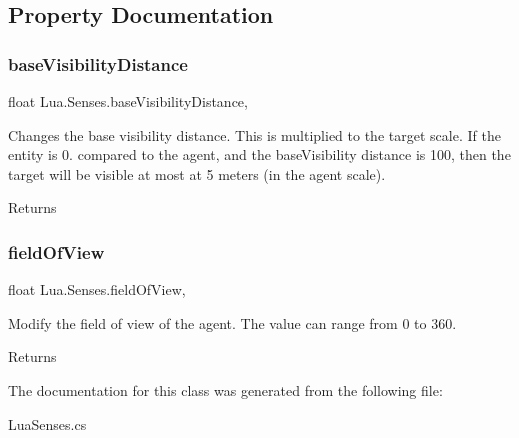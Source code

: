 \subsection{Property Documentation}
\mbox{\label{class_lua_1_1_senses_aed3385cd359ba4734ac8c114b524a1b2}} 
\subsubsection{\texorpdfstring{baseVisibilityDistance}{baseVisibilityDistance}}
{\footnotesize\ttfamily float Lua.\+Senses.\+base\+Visibility\+Distance\hspace{0.3cm}{\ttfamily [get]}, {\ttfamily [set]}}



Changes the base visibility distance. This is multiplied to the target scale. If the entity is 0. compared to the agent, and the base\+Visibility distance is 100, then the target will be visible at most at 5 meters (in the agent scale). 

\begin{DoxyReturn}{Returns}

\end{DoxyReturn}
\mbox{\label{class_lua_1_1_senses_ac4a708caaa7a7381870d4f21d619c2e9}} 
\subsubsection{\texorpdfstring{fieldOfView}{fieldOfView}}
{\footnotesize\ttfamily float Lua.\+Senses.\+field\+Of\+View\hspace{0.3cm}{\ttfamily [get]}, {\ttfamily [set]}}



Modify the field of view of the agent. The value can range from 0 to 360. 

\begin{DoxyReturn}{Returns}

\end{DoxyReturn}


The documentation for this class was generated from the following file\+:\begin{DoxyCompactItemize}
\item 
Lua\+Senses.\+cs\end{DoxyCompactItemize}
